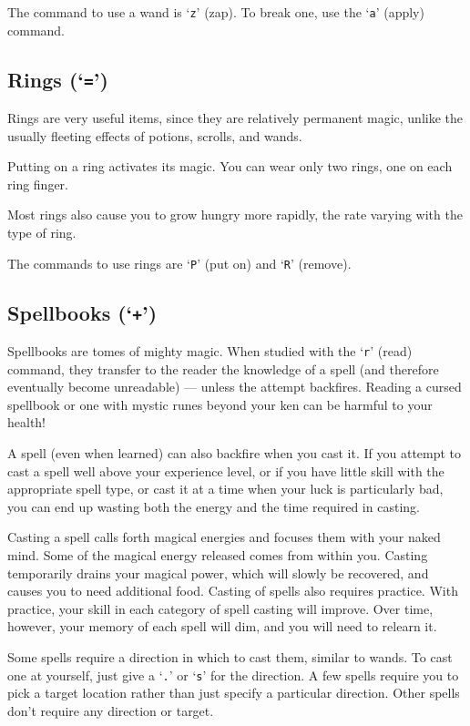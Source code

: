 The command to use a wand is `{\tt z}' (zap).  To break one, use the `{\tt a}'
(apply) command.

\subsection*{Rings (`{\tt =}')}

Rings are very useful items, since they are relatively permanent
magic, unlike the usually fleeting effects of potions, scrolls, and
wands.

Putting on a ring activates its magic.  You can wear only two
rings, one on each ring finger.

Most rings also cause you to grow hungry more rapidly, the rate
varying with the type of ring.

The commands to use rings are `{\tt P}' (put on) and `{\tt R}' (remove).

\subsection*{Spellbooks (`{\tt +}')}

Spellbooks are tomes of mighty magic.  When studied with the `{\tt r}' (read)
command, they transfer to the reader the knowledge of a spell (and
therefore eventually become unreadable) --- unless the attempt backfires.
Reading a cursed spellbook or one with mystic runes beyond
your ken can be harmful to your health!

A spell (even when learned) can also backfire when you cast it.  If you
attempt to cast a spell well above your experience level, or if you have
little skill with the appropriate spell type, or cast it at
a time when your luck is particularly bad, you can end up wasting both the
energy and the time required in casting.

Casting a spell calls forth magical energies and focuses them with
your naked mind.  Some of the magical energy released comes from within
you.
Casting temporarily drains your magical power, which will slowly be
recovered, and causes you to need additional food.
Casting of spells also requires practice.  With practice, your
skill in each category of spell casting will improve.  Over time, however,
your memory of each spell will dim, and you will need to relearn it.

Some spells require a direction in which to cast them, similar to wands.
To cast one at yourself, just give a `{\tt .}' or `{\tt s}' for the direction.
A few spells require you to pick a target location rather than just specify
a particular direction.
Other spells don't require any direction or target.

